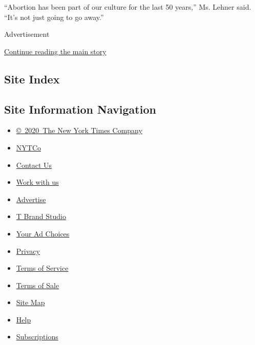 ``Abortion has been part of our culture for the last 50 years,'' Ms.
Lehner said. ``It's not just going to go away.''

Advertisement

\protect\hyperlink{after-bottom}{Continue reading the main story}

\hypertarget{site-index}{%
\subsection{Site Index}\label{site-index}}

\hypertarget{site-information-navigation}{%
\subsection{Site Information
Navigation}\label{site-information-navigation}}

\begin{itemize}
\tightlist
\item
  \href{https://help.nytimes3xbfgragh.onion/hc/en-us/articles/115014792127-Copyright-notice}{©~2020~The
  New York Times Company}
\end{itemize}

\begin{itemize}
\tightlist
\item
  \href{https://www.nytco.com/}{NYTCo}
\item
  \href{https://help.nytimes3xbfgragh.onion/hc/en-us/articles/115015385887-Contact-Us}{Contact
  Us}
\item
  \href{https://www.nytco.com/careers/}{Work with us}
\item
  \href{https://nytmediakit.com/}{Advertise}
\item
  \href{http://www.tbrandstudio.com/}{T Brand Studio}
\item
  \href{https://www.nytimes3xbfgragh.onion/privacy/cookie-policy\#how-do-i-manage-trackers}{Your
  Ad Choices}
\item
  \href{https://www.nytimes3xbfgragh.onion/privacy}{Privacy}
\item
  \href{https://help.nytimes3xbfgragh.onion/hc/en-us/articles/115014893428-Terms-of-service}{Terms
  of Service}
\item
  \href{https://help.nytimes3xbfgragh.onion/hc/en-us/articles/115014893968-Terms-of-sale}{Terms
  of Sale}
\item
  \href{https://spiderbites.nytimes3xbfgragh.onion}{Site Map}
\item
  \href{https://help.nytimes3xbfgragh.onion/hc/en-us}{Help}
\item
  \href{https://www.nytimes3xbfgragh.onion/subscription?campaignId=37WXW}{Subscriptions}
\end{itemize}
